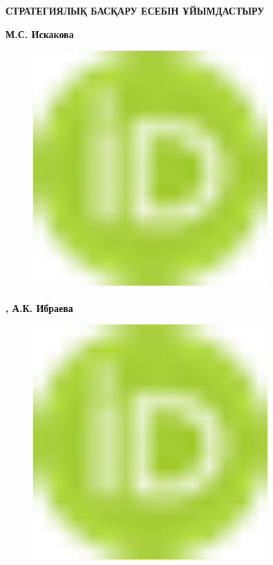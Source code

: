 
{\bfseries СТРАТЕГИЯЛЫҚ БАСҚАРУ ЕСЕБІН ҰЙЫМДАСТЫРУ}

{\bfseries М.С.
Искакова}
\begin{figure}[H]
	\centering
	\includegraphics[width=0.8\textwidth]{media/ekon2/image1}
	\caption*{}
\end{figure}
{\bfseries \textsuperscript{\envelope },
А.К.
Ибраева}
\begin{figure}[H]
	\centering
	\includegraphics[width=0.8\textwidth]{media/ekon2/image1}
	\caption*{}
\end{figure}
